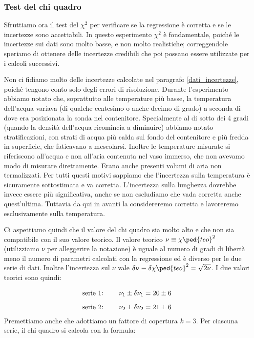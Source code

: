 \subsubsection{Test del chi quadro}
\label{chi_1}

Sfruttiamo ora il test del $\chi^2$ per verificare se la regressione è corretta e se le incertezze sono accettabili.
In questo esperimento $\chi^2$ è fondamentale, poiché le incertezze sui dati sono molto basse, e non molto realistiche;
correggendole speriamo di ottenere delle incertezze credibili che poi possano essere utilizzate per i calcoli successivi.

Non ci fidiamo molto delle incertezze calcolate nel paragrafo \ref{dati_incertezze}, poiché tengono conto solo degli errori
di risoluzione. Durante l'esperimento abbiamo notato che, soprattutto alle temperature più basse, la temperatura dell'acqua
variava (di qualche centesimo o anche decimo di grado) a seconda di dove era posizionata la sonda nel contenitore. Specialmente
al di sotto dei 4 gradi (quando la densità dell'acqua ricomincia a diminuire) abbiamo notato stratificazioni, con strati di acqua
più calda sul fondo del contenitore e più fredda in superficie, che faticavano a mescolarsi. Inoltre le temperature misurate
si riferiscono all'acqua e non all'aria contenuta nel vaso immerso, che non avevamo modo di misurare direttamente. Erano anche
presenti volumi di aria non termalizzati. Per tutti questi motivi sappiamo che l'incertezza sulla temperatura è sicuramente
sottostimata e va corretta. L'incertezza sulla lunghezza dovrebbe invece essere più significativa, anche se non escludiamo
che vada corretta anche quest'ultima. Tuttavia da qui in avanti la considereremo corretta e lavoreremo esclusivamente sulla temperatura.

Ci aspettiamo quindi che il valore del chi quadro sia molto alto e che non sia compatibile con il suo valore teorico. Il valore teorico
$\nu \equiv \chi\ped{teo}^2$ (utilizziamo $\nu$ per alleggerire la notazione) è uguale al numero di gradi di libertà meno
il numero di parametri calcolati con la regressione ed è diverso per le due serie di dati. Inoltre l'incertezza sul
$\nu$ vale $\delta \nu \equiv \delta \chi\ped{teo}^2 = \sqrt{2\nu}$. I due valori teorici sono quindi:

\begin{equation}
    \begin{array}{l @{\hspace{0.8cm}} c}
        \text{serie 1:} & \nu_1 \pm \delta \nu_1 = 20 \pm 6 \\[3mm]
        \text{serie 2:} & \nu_2 \pm \delta \nu_2 = 21 \pm 6
    \end{array}
\end{equation}
%
Premettiamo anche che adottiamo un fattore di copertura $k = 3$.
Per ciascuna serie, il chi quadro si calcola con la formula:

